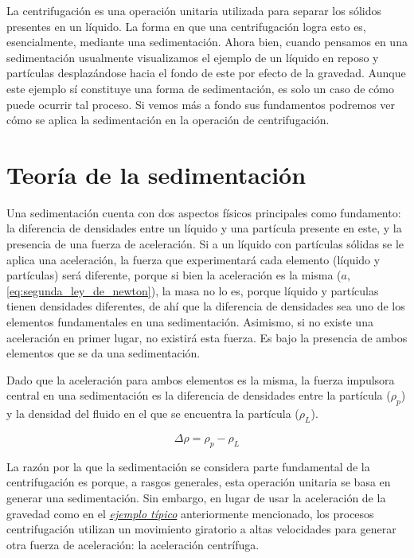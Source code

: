 \documentclass{AsignaturaResumen}
\begin{document}
\fi



La centrifugación es una operación unitaria utilizada para separar los sólidos presentes en un líquido. La forma en que una centrifugación logra esto es, esencialmente, mediante una sedimentación. Ahora bien, cuando pensamos en una sedimentación usualmente visualizamos el \hypertarget{ejemplo_sedimentacion}{ejemplo} de un líquido en reposo y partículas desplazándose hacia el fondo de este por efecto de la gravedad. Aunque este ejemplo sí constituye una forma de sedimentación, es solo un caso de cómo puede ocurrir tal proceso. Si vemos más a fondo sus fundamentos podremos ver cómo se aplica la sedimentación en la operación de centrifugación.



\section{Teoría de la sedimentación}

Una sedimentación cuenta con dos aspectos físicos principales como fundamento: la diferencia de densidades entre un líquido y una partícula presente en este, y la presencia de una fuerza de aceleración. Si a un líquido con partículas sólidas se le aplica una aceleración, la fuerza que experimentará cada elemento (líquido y partículas) será diferente, porque si bien la aceleración es la misma ($a$, \autoref{eq:segunda_ley_de_newton}), la masa no lo es, porque líquido y partículas tienen densidades diferentes, de ahí que la diferencia de densidades sea uno de los elementos fundamentales en una sedimentación. Asimismo, si no existe una aceleración en primer lugar, no existirá esta fuerza. Es bajo la presencia de ambos elementos que se da una sedimentación.

Dado que la aceleración para ambos elementos es la misma, la fuerza impulsora central en una sedimentación es la diferencia de densidades entre la partícula ($\rho_{p}$) y la densidad del fluido en el que se encuentra la partícula ($\rho_{L}$).

\begin{equation}\label{eq:diferencia_de_densidades}
    \Delta\rho = \rho_{p} - \rho_{L}
\end{equation}

La razón por la que la sedimentación se considera parte fundamental de la centrifugación es porque, a rasgos generales, esta operación unitaria se basa en generar una sedimentación. Sin embargo, en lugar de usar la aceleración de la gravedad como en el \emph{\hyperlink{ejemplo_sedimentacion}{ejemplo típico}} anteriormente mencionado, los procesos centrifugación utilizan un movimiento giratorio a altas velocidades para generar otra fuerza de aceleración: la aceleración centrífuga.
\end{document}
